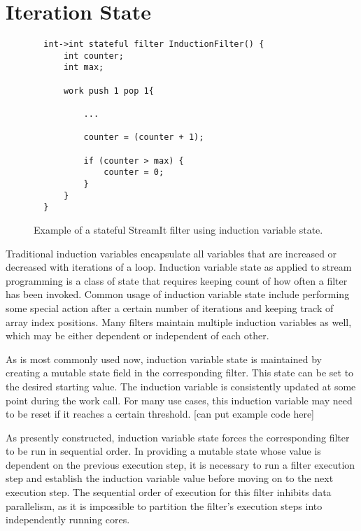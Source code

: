 \section{Iteration State}

\begin{figure}[t]
{\eightpoint
\begin{verbatim}
  int->int stateful filter InductionFilter() {
      int counter;
      int max;
  
      work push 1 pop 1{

          ...

          counter = (counter + 1);

          if (counter > max) {
              counter = 0;
          } 
      }
  }
\end{verbatim}
\caption{Example of a stateful StreamIt filter using induction variable state.\protect\label{fig:filter-example}}}
\end{figure}


Traditional induction variables encapsulate all variables that are
increased or decreased with iterations of a loop.  Induction variable
state as applied to stream programming is a class of state that
requires keeping count of how often a filter has been invoked.  Common
usage of induction variable state include performing some special
action after a certain number of iterations and keeping track of array
index positions.  Many filters maintain multiple induction variables
as well, which may be either dependent or independent of each other.

As is most commonly used now, induction variable state is maintained
by creating a mutable state field in the corresponding filter.  This
state can be set to the desired starting value.  The induction
variable is consistently updated at some point during the work call.
For many use cases, this induction variable may need to be reset if it
reaches a certain threshold. [can put example code here]

As presently constructed, induction variable state forces the
corresponding filter to be run in sequential order.  In providing a
mutable state whose value is dependent on the previous execution step,
it is necessary to run a filter execution step and establish the
induction variable value before moving on to the next execution step.
The sequential order of execution for this filter inhibits data
parallelism, as it is impossible to partition the filter's execution
steps into independently running cores.


